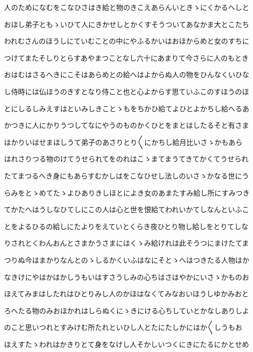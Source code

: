 \documentclass[a4paper,11pt,landscape]{ltjtarticle}
\begin{document}
\par\medskip
人のためになむをこなひさはき給と物のきこえあらんいときゝにくかるへしと
\par\medskip
おほし弟子ともゝいひて人にきかせしとかくすそうついてあなかま大とこたち
\par\medskip
われむさんのほうしにていむことの中にやふるかいはおほからめと女のすちに
\par\medskip
つけてまたそしりとらすあやまつことなし六十にあまりて今さらに人のもとき
\par\medskip
おはむはさるへきにこそはあらめとの給へはよからぬ人の物をひんなくいひな
\par\medskip
し侍時には仏ほうのきすとなり侍こと也と心よからす思ていふこのすほうのほ
\par\medskip
とにしるしみえすはといみしきことゝもをちかひ給てよひとよかちし給へるあ
\par\medskip
かつきに人にかりうつしてなにやうのものかくひとをまとはしたるそと有さま
\par\medskip
はかりいはせまほしうて弟子のあさりとり〱にかちし給月比いさゝかもあら
\par\medskip
はれさりつる物のけてうせられてをのれはこゝまてまうてきてかくてうせられ
\par\medskip
たてまつるへき身にもあらすむかしはをこなひせし法しのいさゝかなる世にう
\par\medskip
らみをとゝめてたゝよひありきしほとによき女のあまたすみ給し所にすみつき
\par\medskip
てかたへはうしなひてしにこの人は心と世を恨給てわれいかてしなんといふこ
\par\medskip
とをよるひるの給しにたよりをえていとくらき夜ひとり物し給しをとりてしな
\par\medskip
りされとくわんおんとさまかうさまにはくゝみ給けれは此そうつにまけたてま
\par\medskip
つりぬ今はまかりなんとのゝしるかくいふはなにそとゝへはつきたる人物はか
\par\medskip
なきけにやはかはかしうもいはすさうしみの心ちはさはやかにいさゝかものお
\par\medskip
ほえてみまはしたれはひとりみし人のかほはなくてみなおいほうしゆかみおと
\par\medskip
ろへたる物のみおほかれはしらぬくにゝきにける心ちしていとかなしありしよ
\par\medskip
のこと思いつれとすみけむ所たれといひし人とたにたしかにはか〱しうもお
\par\medskip
ほえすたゝわれはかきりとて身をなけし人そかしいつくにきにたるにかとせめ
\end{document}

